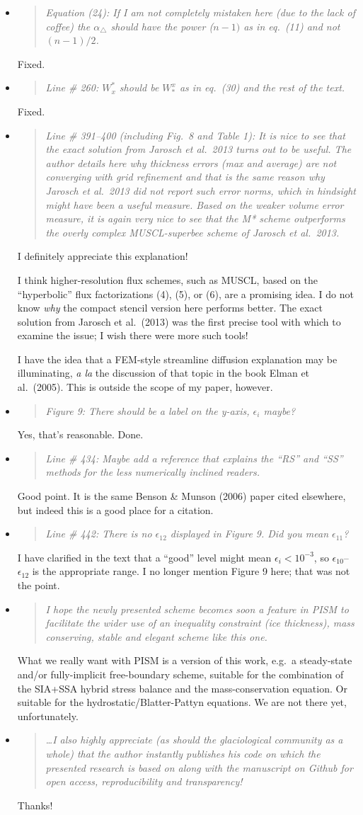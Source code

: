 \documentclass[11pt,reqno]{amsart}
\newcommand{\reply}[2]{
\medskip\medskip
\item  \begin{quote}
\emph{#1}
\end{quote}

\medskip
\noindent #2}
\begin{document}
\begin{itemize}
\reply{Equation (24): If I am not completely mistaken here (due to the lack of coffee) the $\alpha_\triangle$ should have the power ($n-1)$ as in eq.~(11) and not $(n-1)/2$.}
{Fixed.}

\reply{Line \# 260: $W^*_x$ should be $W^x_*$ as in eq.~(30) and the rest of the text.}
{Fixed.}

\reply{Line \# 391--400 (including Fig.~8 and Table 1): It is nice to see that the exact solution from Jarosch et al.~2013 turns out to be useful.  The author details here why thickness errors (max and average) are not converging with grid refinement and that is the same reason why Jarosch et al.~2013 did not report such error norms, which in hindsight might have been a useful measure.  Based on the weaker volume error measure, it is again very nice to see that the M* scheme outperforms the overly complex MUSCL-superbee scheme of Jarosch et al.~2013.}
{I definitely appreciate this explanation!

I think higher-resolution flux schemes, such as MUSCL, based on the ``hyperbolic'' flux factorizations (4), (5), or (6), are a promising idea.  I do not know \emph{why} the compact stencil version here performs better.  The exact solution from Jarosch et al.~(2013) was the first precise tool with which to examine the issue; I wish there were more such tools!

I have the idea that a FEM-style streamline diffusion explanation may be illuminating, \emph{a la} the discussion of that topic in the book Elman et al.~(2005).  This is outside the scope of my paper, however.}

\reply{Figure 9: There should be a label on the y-axis, $\epsilon_i$ maybe?}
{Yes, that's reasonable.  Done.}

\reply{Line \# 434: Maybe add a reference that explains the ``RS'' and ``SS'' methods for the less numerically inclined readers.}
{Good point.  It is the same Benson \& Munson (2006) paper cited elsewhere, but indeed this is a good place for a citation.}

\reply{Line \# 442: There is no $\epsilon_{12}$ displayed in Figure 9.  Did you mean $\epsilon_{11}$?}
{I have clarified in the text that a ``good'' level might mean $\epsilon_i<10^{-3}$, so $\epsilon_{10}$--$\epsilon_{12}$ is the appropriate range.  I no longer mention Figure 9 here; that was not the point.}

\reply{I hope the newly presented scheme becomes soon a feature in PISM to facilitate the wider use of an inequality constraint (ice thickness), mass conserving, stable and elegant scheme like this one.}
{What we really want with PISM is a version of this work, e.g.~a steady-state and/or fully-implicit free-boundary scheme, suitable for the combination of the SIA+SSA hybrid stress balance and the mass-conservation equation.  Or suitable for the hydrostatic/Blatter-Pattyn equations.  We are not there yet, unfortunately.}

\reply{\dots  I also highly appreciate (as should the glaciological community as a whole) that the author instantly publishes his code on which the presented research is based on along with the manuscript on Github for open access, reproducibility and transparency!}
{Thanks!}
\end{itemize}
\end{document}
